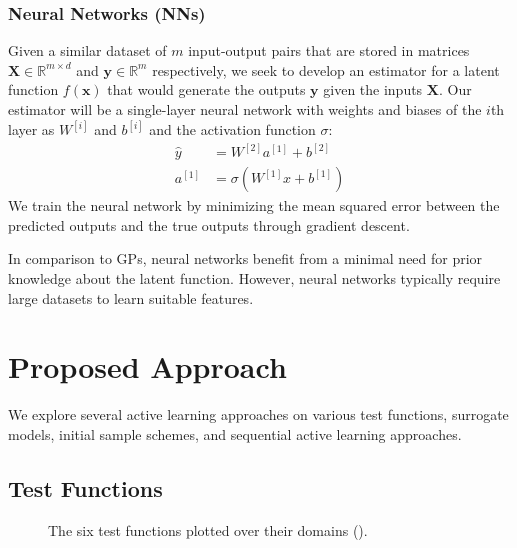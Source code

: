 \documentclass[conference]{IEEEtran}
\begin{document}
    \subsubsection{Neural Networks (NNs)}
    
    Given a similar dataset of $m$ input-output pairs that are stored in matrices $\mathbf{X} \in \mathbb{R}^{m \times d}$ and $\mathbf{y} \in \mathbb{R}^{m}$ respectively, we seek to develop an estimator for a latent function $f(\mathbf{x})$ that would generate the outputs $\mathbf{y}$ given the inputs $\mathbf{X}$. Our estimator will be a single-layer neural network with weights and biases of the $i$th layer as $W^{[i]}$ and $b^{[i]}$ and the activation function $\sigma$:
    \begin{align}
        \hat{y} &= W^{[2]}a^{[1]} + b^{[2]} \\
        a^{[1]} &= \sigma(W^{[1]}x + b^{[1]})
    \end{align}
    We train the neural network by minimizing the mean squared error between the predicted outputs and the true outputs through gradient descent.
    
    In comparison to GPs, neural networks benefit from a minimal need for prior knowledge about the latent function. However, neural networks typically require large datasets to learn suitable features. 
    
	\section{Proposed Approach}
	\label{sec:proposed-approach}
	
	We explore several active learning approaches on various test functions, surrogate models, initial sample schemes, and sequential active learning approaches.
	
	\subsection{Test Functions}
	
	\begin{figure*}[htbp]
	    \centering
	    
	    \caption{The six test functions plotted over their domains ().}
	    \label{fig:test_fns}
	\end{figure*}
	
\end{document}
